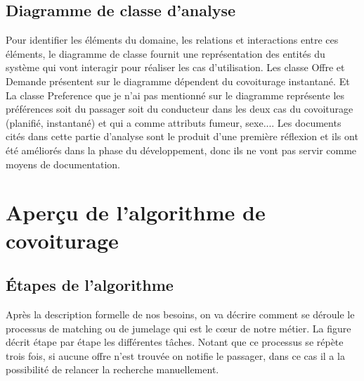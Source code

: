 \subsection{Diagramme de classe d'analyse} %
Pour identifier les éléments du domaine, les relations et interactions entre ces éléments, le diagramme de classe fournit une représentation des entités du système qui vont interagir pour réaliser les cas d'utilisation.\newline
Les classe Offre et Demande présentent sur le diagramme dépendent du covoiturage instantané. Et La classe Preference que je n'ai pas mentionné sur le diagramme représente les préférences soit du passager soit du conducteur dans les deux cas du covoiturage (planifié, instantané) et qui a comme attributs fumeur, sexe....\newline
Les documents cités dans cette partie d'analyse sont le produit d'une première réflexion et ils ont été améliorés dans la phase du développement, donc ils ne vont pas servir comme moyens de documentation.

\section{Aperçu de l'algorithme de covoiturage} %
\label{sec:Aperçu de l'algorithme de covoiturage}
\subsection{Étapes de l'algorithme} %
Après la description formelle de nos besoins, on va décrire comment se déroule le processus de matching ou de jumelage qui est le cœur de notre métier.
\newline
La figure  décrit étape par étape les différentes tâches. Notant que ce processus se répète trois fois, si aucune offre n'est trouvée on notifie le passager, dans ce cas il a la possibilité de relancer la recherche manuellement.

